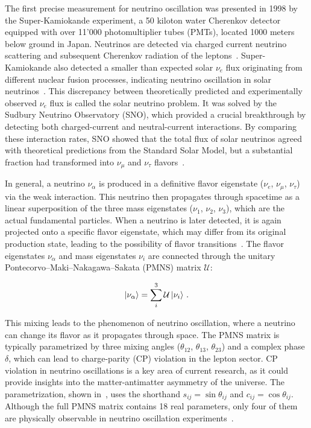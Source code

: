 The first precise measurement for neutrino oscillation was presented in 1998 by the Super-Kamiokande experiment, a 50 kiloton water Cherenkov detector equipped with over 11'000 photomultiplier tubes (PMTs), located 1000 meters below ground in Japan. Neutrinos are detected via charged current neutrino scattering and subsequent Cherenkov radiation of the leptons~\cite{super-kamiokande_collaboration_evidence_1998}. 
Super-Kamiokande also detected a smaller than expected solar $\nu_e$ flux originating from different nuclear fusion processes, indicating neutrino oscillation in solar neutrinos~\cite{super-kamiokande_collaboration_solar_2001}. This discrepancy between theoretically predicted and experimentally observed $\nu_e$ flux is called the solar neutrino problem. It was solved by the Sudbury Neutrino Observatory (SNO), which provided a crucial breakthrough by detecting both charged-current and neutral-current interactions. By comparing these interaction rates, SNO showed that the total flux of solar neutrinos agreed with theoretical predictions from the Standard Solar Model, but a substantial fraction had transformed into $\nu_\mu$ and $\nu_\tau$ flavors~\cite{SNO_solar_neutrino_2022}.

In general, a neutrino $\nu_{\alpha}$ is produced in a definitive flavor eigenstate ($\nu_e$, $\nu_{\mu}$, $\nu_{\tau}$) via the weak interaction. This neutrino then propagates through spacetime as a linear superposition of the three mass eigenstates ($\nu_1$, $\nu_2$, $\nu_3$), which are the actual fundamental particles. When a neutrino is later detected, it is again projected onto a specific flavor eigenstate, which may differ from its original production state, leading to the possibility of flavor transitions~\cite{thomson_modern_2013, zuber_neutrino_2020}. 
The flavor eigenstates $\nu_{\alpha}$ and mass eigenstates $\nu_i$ are connected through the unitary Pontecorvo–Maki–Nakagawa–Sakata (PMNS) matrix $\mathcal{U}$:

\begin{equation}
\label{eq:neutrino_eigenstates}
	\ket{\nu_{\alpha}}= \sum_i^3 \mathcal{U} \ket{\nu_i}\,.
\end{equation}

This mixing leads to the phenomenon of neutrino oscillation, where a neutrino can change its flavor as it propagates through space. 
The PMNS matrix is typically parametrized by three mixing angles ($\theta_{12}$, $\theta_{13}$, $\theta_{23}$) and a complex phase $\delta$, which can lead to charge-parity (CP) violation in the lepton sector. CP violation in neutrino oscillations is a key area of current research, as it could provide insights into the matter-antimatter asymmetry of the universe. The parametrization, shown in~, uses the shorthand $s_{ij} = \sin \theta_{ij}$ and $c_{ij} = \cos\theta_{ij}$. Although the full PMNS matrix contains 18 real parameters, only four of them are physically observable in neutrino oscillation experiments~\cite{navas_review_2024, thomson_modern_2013}.


